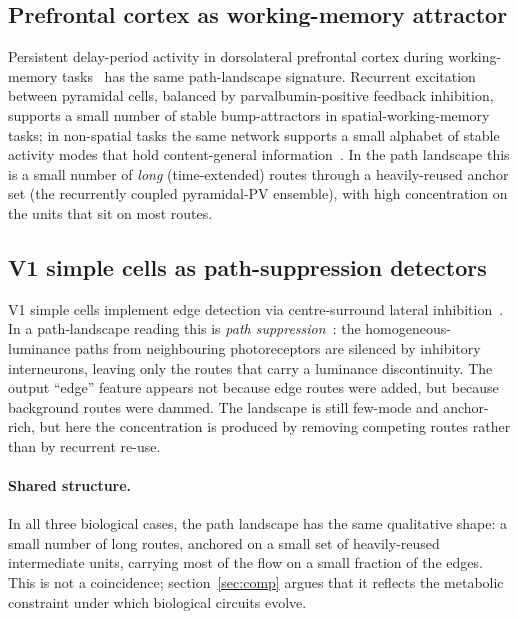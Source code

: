 \documentclass[11pt,a4paper]{article}
\begin{document}
\subsection{Prefrontal cortex as working-memory attractor}

Persistent delay-period activity in dorsolateral prefrontal cortex
during working-memory tasks~\cite{goldmanrakic1995,funahashi1989}
has the same path-landscape signature. Recurrent excitation between
pyramidal cells, balanced by parvalbumin-positive feedback
inhibition, supports a small number of stable bump-attractors in
spatial-working-memory tasks; in non-spatial tasks the same network
supports a small alphabet of stable activity modes that hold
content-general
information~\cite{wang2013pfc,constantinidis2018workingmemory}. In
the path landscape this is a small number of \emph{long}
(time-extended) routes through a heavily-reused anchor set (the
recurrently coupled pyramidal-PV ensemble), with high concentration
on the units that sit on most routes.

\subsection{V1 simple cells as path-suppression detectors}

V1 simple cells implement edge detection via centre-surround lateral
inhibition~\cite{hubel1962}. In a path-landscape reading this is
\emph{path suppression}~\cite{companion}: the homogeneous-luminance
paths from neighbouring photoreceptors are silenced by inhibitory
interneurons, leaving only the routes that carry a luminance
discontinuity. The output ``edge'' feature appears not because edge
routes were added, but because background routes were dammed. The
landscape is still few-mode and anchor-rich, but here the
concentration is produced by removing competing routes rather than by
recurrent re-use.

\paragraph{Shared structure.}
In all three biological cases, the path landscape has the same
qualitative shape: a small number of long routes, anchored on a
small set of heavily-reused intermediate units, carrying most of the
flow on a small fraction of the edges. This is not a coincidence;
section~\ref{sec:comp} argues that it reflects the metabolic
constraint under which biological circuits evolve.

\end{document}
